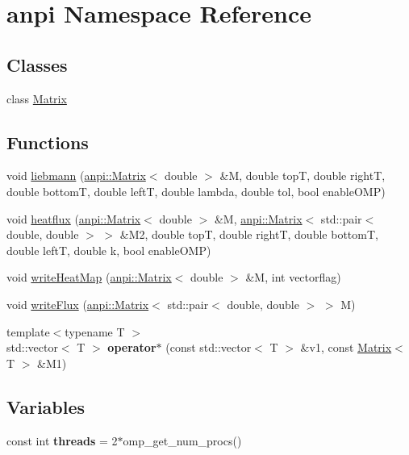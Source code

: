 \hypertarget{namespaceanpi}{}\section{anpi Namespace Reference}
\label{namespaceanpi}
\subsection*{Classes}
\begin{DoxyCompactItemize}
\item 
class \hyperlink{classanpi_1_1_matrix}{Matrix}
\end{DoxyCompactItemize}
\subsection*{Functions}
\begin{DoxyCompactItemize}
\item 
void \hyperlink{namespaceanpi_a1d6b418745abe3f2cfb4fa2dadd952f5}{liebmann} (\hyperlink{classanpi_1_1_matrix}{anpi\+::\+Matrix}$<$ double $>$ \&M, double top\+T, double right\+T, double bottom\+T, double left\+T, double lambda, double tol, bool enable\+O\+M\+P)
\item 
void \hyperlink{namespaceanpi_afabb544c6ba4b0e74c64819514dde57c}{heatflux} (\hyperlink{classanpi_1_1_matrix}{anpi\+::\+Matrix}$<$ double $>$ \&M, \hyperlink{classanpi_1_1_matrix}{anpi\+::\+Matrix}$<$ std\+::pair$<$ double, double $>$ $>$ \&M2, double top\+T, double right\+T, double bottom\+T, double left\+T, double k, bool enable\+O\+M\+P)
\item 
void \hyperlink{namespaceanpi_a4ec8112d77f2af26d8da1954cc465707}{write\+Heat\+Map} (\hyperlink{classanpi_1_1_matrix}{anpi\+::\+Matrix}$<$ double $>$ \&M, int vectorflag)
\item 
void \hyperlink{namespaceanpi_a2f885fcb56cf9214852d38588948a0d6}{write\+Flux} (\hyperlink{classanpi_1_1_matrix}{anpi\+::\+Matrix}$<$ std\+::pair$<$ double, double $>$ $>$ M)
\item 
\hypertarget{namespaceanpi_aa345df2fcc1e2936fa69be3220c3eb1d}{}{\footnotesize template$<$typename T $>$ }\\std\+::vector$<$ T $>$ {\bfseries operator$\ast$} (const std\+::vector$<$ T $>$ \&v1, const \hyperlink{classanpi_1_1_matrix}{Matrix}$<$ T $>$ \&M1)\label{namespaceanpi_aa345df2fcc1e2936fa69be3220c3eb1d}

\end{DoxyCompactItemize}
\subsection*{Variables}
\begin{DoxyCompactItemize}
\item 
\hypertarget{namespaceanpi_af2f4674639e6136c0740f304b93aca40}{}const int {\bfseries threads} = 2$\ast$omp\+\_\+get\+\_\+num\+\_\+procs()\label{namespaceanpi_af2f4674639e6136c0740f304b93aca40}

\end{DoxyCompactItemize}


